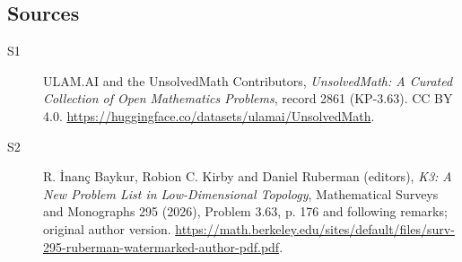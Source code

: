 \documentclass[11pt]{article}
\begin{document}
\subsection{Sources}
\begin{description}
\item[\hypertarget{source:2861:1}{S1}] ULAM.AI and the UnsolvedMath Contributors, \emph{UnsolvedMath: A Curated Collection of Open Mathematics Problems}, record 2861 (KP-3.63). CC BY 4.0. \url{https://huggingface.co/datasets/ulamai/UnsolvedMath}.
\item[\hypertarget{source:2861:2}{S2}] R. İnanç Baykur, Robion C. Kirby and Daniel Ruberman (editors), \emph{K3: A New Problem List in Low-Dimensional Topology}, Mathematical Surveys and Monographs 295 (2026), Problem 3.63, p. 176 and following remarks; original author version. \url{https://math.berkeley.edu/sites/default/files/surv-295-ruberman-watermarked-author-pdf.pdf}.
\end{description}
\label{end:2861}
\end{document}
